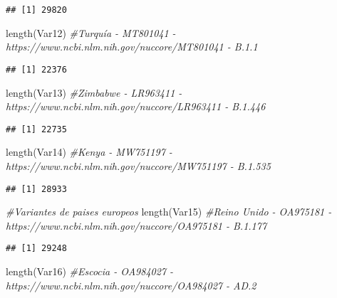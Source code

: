 \documentclass[
]{article}
\newenvironment{Shaded}{\begin{snugshade}}{\end{snugshade}}
\newcommand{\CommentTok}[1]{\textcolor[rgb]{0.56,0.35,0.01}{\textit{#1}}}
\newcommand{\FunctionTok}[1]{\textcolor[rgb]{0.00,0.00,0.00}{#1}}
\newcommand{\NormalTok}[1]{#1}
\begin{document}
\begin{verbatim}
## [1] 29820
\end{verbatim}

\begin{Shaded}
\begin{Highlighting}[]
\FunctionTok{length}\NormalTok{(Var12) }\CommentTok{\#Turquía {-} MT801041 {-} https://www.ncbi.nlm.nih.gov/nuccore/MT801041 {-} B.1.1}
\end{Highlighting}
\end{Shaded}

\begin{verbatim}
## [1] 22376
\end{verbatim}

\begin{Shaded}
\begin{Highlighting}[]
\FunctionTok{length}\NormalTok{(Var13) }\CommentTok{\#Zimbabwe {-} LR963411 {-} https://www.ncbi.nlm.nih.gov/nuccore/LR963411 {-} B.1.446}
\end{Highlighting}
\end{Shaded}

\begin{verbatim}
## [1] 22735
\end{verbatim}

\begin{Shaded}
\begin{Highlighting}[]
\FunctionTok{length}\NormalTok{(Var14) }\CommentTok{\#Kenya {-} MW751197 {-} https://www.ncbi.nlm.nih.gov/nuccore/MW751197 {-} B.1.535}
\end{Highlighting}
\end{Shaded}

\begin{verbatim}
## [1] 28933
\end{verbatim}

\begin{Shaded}
\begin{Highlighting}[]
\CommentTok{\#Variantes de paises europeos}
\FunctionTok{length}\NormalTok{(Var15) }\CommentTok{\#Reino Unido {-} OA975181  {-} https://www.ncbi.nlm.nih.gov/nuccore/OA975181 {-} B.1.177}
\end{Highlighting}
\end{Shaded}

\begin{verbatim}
## [1] 29248
\end{verbatim}

\begin{Shaded}
\begin{Highlighting}[]
\FunctionTok{length}\NormalTok{(Var16) }\CommentTok{\#Escocia {-} OA984027 {-} https://www.ncbi.nlm.nih.gov/nuccore/OA984027 {-} AD.2}
\end{Highlighting}
\end{Shaded}
\end{document}
